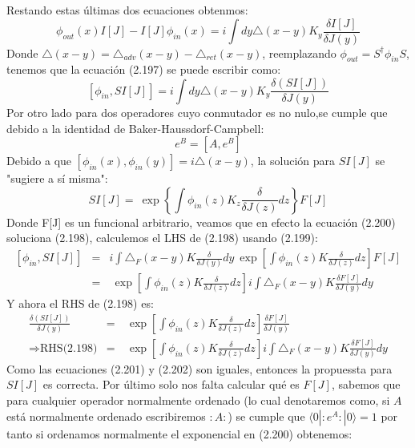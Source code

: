 Restando estas últimas dos ecuaciones obtenmos:
\begin{equation}
\phi_{out}(x)I[J]-I[J]\phi_{in}(x)=i\int dy\triangle(x-y)K_y\frac{\delta I[J]}{\delta J(y)}
\end{equation}
Donde $\triangle(x-y)=\triangle_{adv}(x-y)-\triangle_{ret}(x-y)$, reemplazando $\phi_{out}=S^{\dagger}\phi_{in}S$, tenemos que la ecuación (2.197) se puede escribir como:
\begin{equation}
\left[\phi_{in},SI[J]\right]=i\int dy\triangle(x-y)K_{y}\frac{\delta (SI[J])}{\delta J(y)}
\end{equation}
Por otro lado para dos operadores cuyo conmutador es no nulo,se cumple que debido a la identidad de Baker-Haussdorf-Campbell:
\begin{equation}
[A,B]e^B=[A,e^B]
\end{equation} 
Debido a que $[\phi_{in}(x),\phi_{in}(y)]=i\triangle(x-y)$, la solución para $SI[J]$ se "sugiere a sí misma":
\begin{equation}
SI[J]=\ \exp\left\{ \int\phi_{in}(z)K_{z}\frac{\delta}{\delta J(z)}dz\right\} F[J]
\end{equation}
Donde F[J] es un funcional arbitrario, veamos que en efecto la ecuación (2.200) soluciona (2.198), calculemos el LHS de (2.198) usando (2.199):
\begin{eqnarray}
\nonumber \left[\phi_{in},SI[J]\right]&=&i\int\triangle_{F}(x-y)K\frac{\delta}{\delta J(y)}dy\ \exp\left[\int\phi_{in}(z)K\frac{\delta}{\delta J(z)}dz\right]F[J]\\
&=&\ \exp\left[\int\phi_{in}(z)K\frac{\delta}{\delta J(z)}dz\right]i\int\triangle_{F}(x-y)K\frac{\delta F[J]}{\delta J(y)}dy
\end{eqnarray}
Y ahora el RHS de (2.198) es:
\begin{eqnarray}
\nonumber \frac{\delta(SI[J])}{\delta J(y)}&=&\ \exp\left[\int\phi_{in}(z)K\frac{\delta}{\delta J(z)}dz\right]\frac{\delta F[J]}{\delta J(y)}\\
\Rightarrow \text{RHS(2.198)}&=& \ \exp\left[\int\phi_{in}(z)K\frac{\delta}{\delta J(z)}dz\right]i\int\triangle_{F}(x-y)K\frac{\delta F[J]}{\delta J(y)}dy
\end{eqnarray}
Como las ecuaciones (2.201) y (2.202) son iguales, entonces la propuessta para $SI[J]$ es correcta. Por último solo nos falta calcular qué es $F[J]$, sabemos que para cualquier operador normalmente ordenado (lo cual denotaremos como, si $A$ está normalmente ordenado escribiremos $:A:$) se cumple que $\langle 0|:e^A:|0\rangle=1$ por tanto si ordenamos normalmente el exponencial en (2.200) obtenemos:
